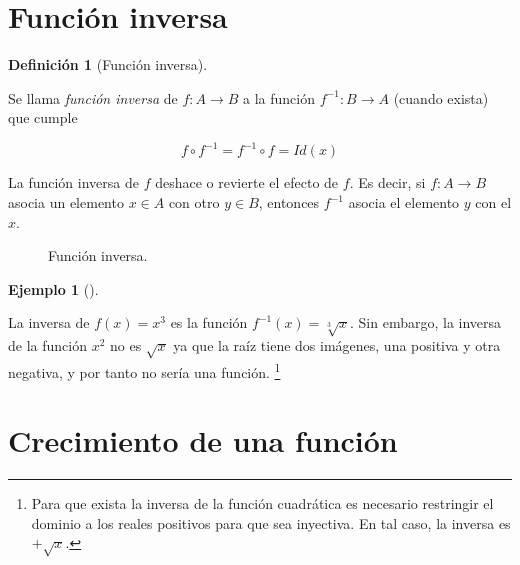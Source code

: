\documentclass[
  a4paper,
]{scrreport}
\theoremstyle{plain}
\theoremstyle{plain}
\theoremstyle{definition}
\newtheorem{definition}{Definición}[chapter]
\theoremstyle{definition}
\newtheorem{example}{Ejemplo}[chapter]
\theoremstyle{plain}
\theoremstyle{remark}
\begin{document}
\hypertarget{funciuxf3n-inversa-1}{%
\section{Función inversa}\label{funciuxf3n-inversa-1}}

\leavevmode{}%
\begin{definition}[Función inversa]\label{def-funcion-inversa}

Se llama \emph{función inversa} de \(f:A\rightarrow B\) a la función
\(f^{-1}:B\rightarrow A\) (cuando exista) que cumple

\[f\circ f^{-1}=f^{-1}\circ f=Id(x)\]

\end{definition}

La función inversa de \(f\) deshace o revierte el efecto de \(f\). Es
decir, si \(f:A\rightarrow B\) asocia un elemento \(x\in A\) con otro
\(y\in B\), entonces \(f^{-1}\) asocia el elemento \(y\) con el \(x\).

\begin{figure}

{\centering 



}

\caption{Función inversa.}

\end{figure}

\leavevmode{}%
\begin{example}[]\label{exm-funcion-inversa}

La inversa de \(f(x)=x^3\) es la función \(f^{-1}(x)=\sqrt[3]{x}.\) Sin
embargo, la inversa de la función \(x^2\) no es \(\sqrt{x}\) ya que la
raíz tiene dos imágenes, una positiva y otra negativa, y por tanto no
sería una función. \footnote{Para que exista la inversa de la función
  cuadrática es necesario restringir el dominio a los reales positivos
  para que sea inyectiva. En tal caso, la inversa es \(+\sqrt{x}\).}

\end{example}

\hypertarget{crecimiento-de-una-funciuxf3n}{%
\section{Crecimiento de una
función}\label{crecimiento-de-una-funciuxf3n}}
\end{document}
